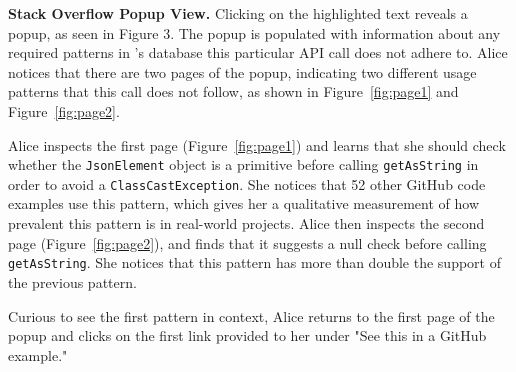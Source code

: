 {\bf Stack Overflow Popup View.}
Clicking on the highlighted text reveals a popup, as seen in Figure 3. The popup is populated with information about any required patterns in {\soa}'s database this particular API call does not adhere to. Alice notices that there are two pages of the popup, indicating two different usage patterns that this call does not follow, as shown in Figure~\ref{fig:page1} and Figure~\ref{fig:page2}. 

Alice inspects the first page (Figure~\ref{fig:page1}) and learns that she should check whether the {\tt JsonElement} object is a primitive before calling {\tt getAsString} in order to avoid a {\tt ClassCastException}. She notices that 52 other GitHub code examples use this pattern, which gives her a qualitative measurement of how prevalent this pattern is in real-world projects.
Alice then inspects the second page (Figure~\ref{fig:page2}), and finds that it suggests a null check before calling {\tt getAsString}. She notices that this pattern has more than double the support of the previous pattern.

Curious to see the first pattern in context, Alice returns to the first page of the popup and clicks on the first link provided to her under "See this in a GitHub example."

